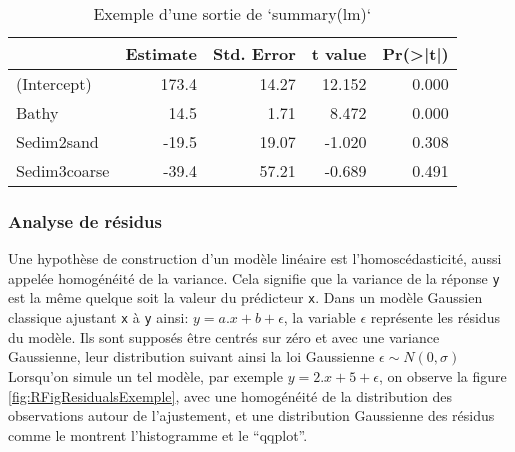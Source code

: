 \documentclass[french,a4paper]{article}
\begin{document}
\begin{table}

\caption{\label{tab:RTableSummary}Exemple d'une sortie de `summary(lm)`}
\centering
\begin{tabular}[t]{l|r|r|r|r}
\hline
  & Estimate & Std. Error & t value & Pr(>|t|)\\
\hline
(Intercept) & 173.4 & 14.27 & 12.152 & 0.000\\
\hline
Bathy & 14.5 & 1.71 & 8.472 & 0.000\\
\hline
Sedim2sand & -19.5 & 19.07 & -1.020 & 0.308\\
\hline
Sedim3coarse & -39.4 & 57.21 & -0.689 & 0.491\\
\hline
\end{tabular}
\end{table}

\hypertarget{analyse-de-residus}{%
\subsubsection{Analyse de résidus}\label{analyse-de-residus}}

Une hypothèse de construction d'un modèle linéaire est
l'homoscédasticité, aussi appelée homogénéité de la variance. Cela
signifie que la variance de la réponse \texttt{y} est la même quelque
soit la valeur du prédicteur \texttt{x}. Dans un modèle Gaussien
classique ajustant \texttt{x} à \texttt{y} ainsi:
\(y = a.x + b + \epsilon\), la variable \(\epsilon\) représente les
résidus du modèle. Ils sont supposés être centrés sur zéro et avec une
variance Gaussienne, leur distribution suivant ainsi la loi Gaussienne
\(\epsilon \sim N(0, \sigma)\)\\
Lorsqu'on simule un tel modèle, par exemple \(y = 2.x + 5 + \epsilon\),
on observe la figure \ref{fig:RFigResidualsExemple}, avec une
homogénéité de la distribution des observations autour de l'ajustement,
et une distribution Gaussienne des résidus comme le montrent
l'histogramme et le ``qqplot''.
\end{document}
